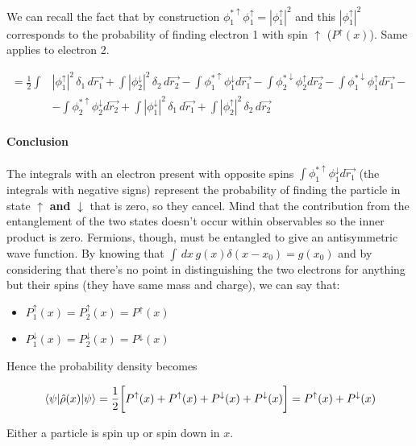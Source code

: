 			We can recall the fact that by construction $\phi_1^{*\uparrow}\phi_1^\uparrow=|\phi_1^\uparrow|^2$  and this $|\phi_1^\uparrow|^2$ corresponds to the probability of finding electron 1 with spin $\uparrow$ ($P^\uparrow(x)$).
			Same applies to electron 2.

			\begin{align*}
				=\frac{1}{2}\int&|\phi_1^\uparrow|^2 \,\delta_1\, d\vec{r_1}+\int |\phi_2^\downarrow|^2\, \delta_2\, d\vec{r_2}-\int \phi_1^{*\uparrow}\phi_1^\downarrow d\vec{r_1}-\int \phi_2^{*\downarrow}\phi_2^\uparrow d\vec{r_2}-\int \phi_1^{*\downarrow}\phi_1^\uparrow d\vec{r_1}-\\
												&-\int \phi_2^{*\uparrow}\phi_2^\downarrow d\vec{r_2}+\int |\phi_1^\downarrow|^2\, \delta_1\, d\vec{r_1}+\int |\phi_2^\uparrow|^2\, \delta_2\, d\vec{r_2}
			\end{align*}

			\paragraph{Conclusion}
			The integrals with an electron present with opposite spins $\int \phi_1^{*\uparrow}\phi_1^\downarrow d\vec{r_1}$ (the integrals with negative signs) represent the probability of finding the particle in state $\uparrow$ \textbf{and} $\downarrow$ that is zero, so they cancel.
			Mind that the contribution from the entanglement of the two states doesn't occur within observables so the inner product is zero.
			Fermions, though, must be entangled to give an antisymmetric wave function.
			By knowing that $\int\,dx\, g(x)\delta(x-x_0)=g(x_0)$ and by considering that there's no point in distinguishing the two electrons for anything but their spins (they have same mass and charge), we can say that:

			\begin{multicols}{2}
				\begin{itemize}
					\item $P_1^\uparrow(x)=P_2^\uparrow(x)=P^\uparrow(x)$
					\item $P_1^\downarrow(x)=P_2^\downarrow(x)=P^\downarrow(x)$
				\end{itemize}
			\end{multicols}

			Hence the probability density becomes

			$$\mel{\psi}{\hat{\rho}(x)}{\psi}=\frac{1}{2}\bigg[P^\uparrow(x)+P^\uparrow(x)+P^\downarrow(x)+P^\downarrow(x)\bigg]=P^\uparrow(x)+P^\downarrow(x)$$

			Either a particle is spin up or spin down in $x$.

